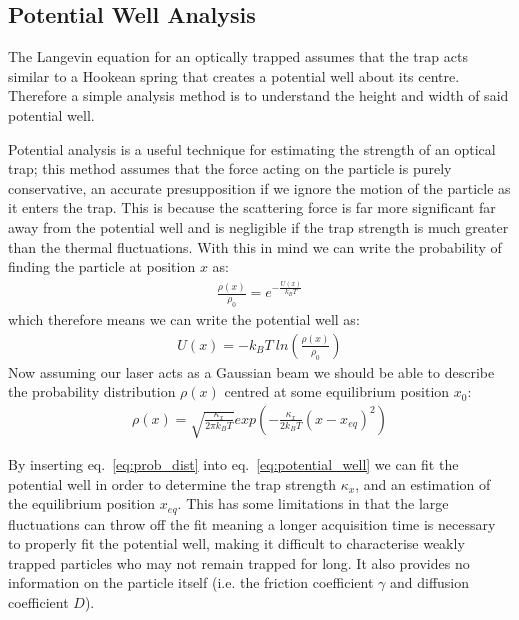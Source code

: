 \subsection{Potential Well Analysis}
The Langevin equation for an optically trapped assumes that the trap 
acts similar to a Hookean spring that creates a potential well about 
its centre. Therefore a simple analysis method is to understand the 
height and width of said potential well. 

Potential analysis is a useful technique for estimating the strength 
of an optical trap; this method assumes that the force acting on the 
particle is purely conservative, an accurate presupposition if we 
ignore the motion of the particle as it enters the trap. This is 
because the scattering force is far more significant far away from 
the potential well and is negligible if the trap strength is much 
greater than the thermal fluctuations. With this in mind we can 
write the probability of finding the particle at position $x$ as:
\begin{align}
	\frac{\rho(x)}{\rho_0} = e^{-\frac{U(x)}{k_{B}T}} 
\end{align}
which therefore means we can write the potential well as:
\begin{align}
	\label{eq:potential_well}
	U(x)=-k_BT\ ln\left(\frac{\rho(x)}{\rho_0} \right)
\end{align}
Now assuming our laser acts as a Gaussian beam we should be able 
to describe the probability distribution $\rho(x)$ centred at 
some equilibrium position $x_0$:
\begin{align}
	\label{eq:prob_dist}
	\rho(x)= \sqrt{\frac{\kappa_x}{2\pi k_BT}} exp\left(-\frac{\kappa_x}{2k_BT}(x-x_{eq})^2\right)
\end{align}

By inserting eq.~\ref{eq:prob_dist} into eq.~\ref{eq:potential_well} 
we can fit the potential well in order to determine the trap strength 
$\kappa_x$, and an estimation of the equilibrium position $x_{eq}$. 
This has some limitations in that the large fluctuations can throw 
off the fit meaning a longer acquisition time is necessary to properly 
fit the potential well, making it difficult to characterise weakly 
trapped particles who may not remain trapped for long. It also 
provides no information on the particle itself (i.e. the friction 
coefficient $\gamma$ and diffusion coefficient $D$).

